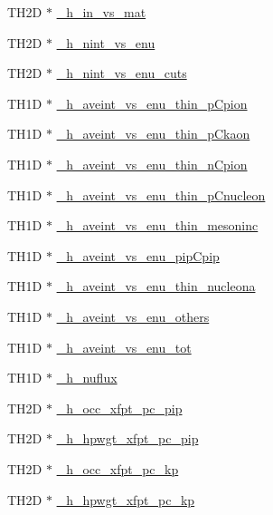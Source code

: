 \begin{DoxyCompactItemize}
\item 
T\-H2\-D $\ast$ \hyperlink{struct_hist_list_a99d4e0ee524da7ff7d12990b3159517a}{\-\_\-h\-\_\-in\-\_\-vs\-\_\-mat}
\item 
T\-H2\-D $\ast$ \hyperlink{struct_hist_list_a8797ee3ee7591db8ab074eceec908417}{\-\_\-h\-\_\-nint\-\_\-vs\-\_\-enu}
\item 
T\-H2\-D $\ast$ \hyperlink{struct_hist_list_abad3b43d8ff27871b528111c3d11cef5}{\-\_\-h\-\_\-nint\-\_\-vs\-\_\-enu\-\_\-cuts}
\item 
T\-H1\-D $\ast$ \hyperlink{struct_hist_list_a382ef18b8db52f3c710887dee822bde7}{\-\_\-h\-\_\-aveint\-\_\-vs\-\_\-enu\-\_\-thin\-\_\-p\-Cpion}
\item 
T\-H1\-D $\ast$ \hyperlink{struct_hist_list_ad649e99463708c708116b66f69fb2cb3}{\-\_\-h\-\_\-aveint\-\_\-vs\-\_\-enu\-\_\-thin\-\_\-p\-Ckaon}
\item 
T\-H1\-D $\ast$ \hyperlink{struct_hist_list_a1c7c4497fe5ab73f72bcb1c91a6a7d61}{\-\_\-h\-\_\-aveint\-\_\-vs\-\_\-enu\-\_\-thin\-\_\-n\-Cpion}
\item 
T\-H1\-D $\ast$ \hyperlink{struct_hist_list_a8fd8cece486c6f2e808937d0b51da296}{\-\_\-h\-\_\-aveint\-\_\-vs\-\_\-enu\-\_\-thin\-\_\-p\-Cnucleon}
\item 
T\-H1\-D $\ast$ \hyperlink{struct_hist_list_ac5d1086e90acca597277d4c14b99e454}{\-\_\-h\-\_\-aveint\-\_\-vs\-\_\-enu\-\_\-thin\-\_\-mesoninc}
\item 
T\-H1\-D $\ast$ \hyperlink{struct_hist_list_ae766a15e96658165f0d718bca14e9e2f}{\-\_\-h\-\_\-aveint\-\_\-vs\-\_\-enu\-\_\-pip\-Cpip}
\item 
T\-H1\-D $\ast$ \hyperlink{struct_hist_list_a3927ab6a626b3f0bcf869619802bab7b}{\-\_\-h\-\_\-aveint\-\_\-vs\-\_\-enu\-\_\-thin\-\_\-nucleona}
\item 
T\-H1\-D $\ast$ \hyperlink{struct_hist_list_ad8a4ad5401b4da1a8726e07b1de596fe}{\-\_\-h\-\_\-aveint\-\_\-vs\-\_\-enu\-\_\-others}
\item 
T\-H1\-D $\ast$ \hyperlink{struct_hist_list_a539ed85865e12fb9d1199c073e311935}{\-\_\-h\-\_\-aveint\-\_\-vs\-\_\-enu\-\_\-tot}
\item 
T\-H1\-D $\ast$ \hyperlink{struct_hist_list_af12f1c42bb40e8093ed4a05ea961a2ab}{\-\_\-h\-\_\-nuflux}
\item 
T\-H2\-D $\ast$ \hyperlink{struct_hist_list_a353a004cac0b31d7bb51a0b69b2fd897}{\-\_\-h\-\_\-occ\-\_\-xfpt\-\_\-pc\-\_\-pip}
\item 
T\-H2\-D $\ast$ \hyperlink{struct_hist_list_aafe90f38cae3e57f9f789e7af2c240a3}{\-\_\-h\-\_\-hpwgt\-\_\-xfpt\-\_\-pc\-\_\-pip}
\item 
T\-H2\-D $\ast$ \hyperlink{struct_hist_list_adfd90cd43bca67431c0b52392f44dc8d}{\-\_\-h\-\_\-occ\-\_\-xfpt\-\_\-pc\-\_\-kp}
\item 
T\-H2\-D $\ast$ \hyperlink{struct_hist_list_a534409c384da12897ac101a95852e54c}{\-\_\-h\-\_\-hpwgt\-\_\-xfpt\-\_\-pc\-\_\-kp}
\end{DoxyCompactItemize}


